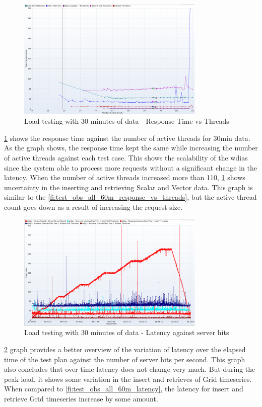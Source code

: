 \begin{figure}[htp]
    \centering
    \includegraphics[width=0.8\textwidth]{results/obs/all/obs_all_30m_response_times_vs_threads.png}
    \caption{Load testing with 30 minutes of data - Response Time vs Threads}
    \label{fi:test_obs_all_30m_response_vs_threads}
\end{figure}

\cref{fi:test_obs_all_30m_response_vs_threads} shows the response time against the number of active threads for 30min data. As the graph shows, the response time kept the same while increasing the number of active threads against each test case. This shows the scalability of the \acrshort{wdias} since the system able to process more requests without a significant change in the latency.
When the number of active threads increased more than 110, \cref{fi:test_obs_all_30m_response_vs_threads} shows uncertainty in the inserting and retrieving Scalar and Vector data. This graph is similar to the \cref{fi:test_obs_all_60m_response_vs_threads}, but the active thread count goes down as a result of increasing the request size.

\begin{figure}[htp]
    \centering
    \includegraphics[width=0.8\textwidth]{results/obs/all/obs_all_30m_res_latencies_against_hits.png}
    \caption{Load testing with 30 minutes of data - Latency against server hits}
    \label{fi:test_obs_all_30m_latency}
\end{figure}
\cref{fi:test_obs_all_30m_latency} graph provides a better overview of the variation of latency over the elapsed time of the test plan against the number of server hits per second. This graph also concludes that over time latency does not change very much. But during the peak load, it shows some variation in the insert and retrieves of Grid timeseries.
When compared to \cref{fi:test_obs_all_60m_latency}, the latency for insert and retrieve Grid timeseries increase by some amount.



